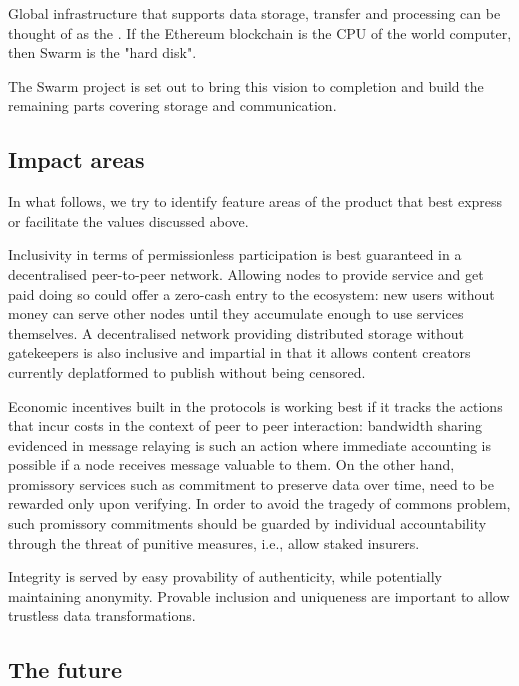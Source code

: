 Global infrastructure that supports data storage, transfer and processing 
can be thought of as the . If the Ethereum blockchain is the CPU of the world computer, then Swarm is the "hard disk".

The Swarm project is set out to bring this vision to completion and build the remaining parts covering storage and communication. 

\subsection{Impact areas \statusorange}

In what follows, we try to identify feature areas of the product that best express or facilitate the values discussed above. 

Inclusivity in terms of permissionless participation is best guaranteed in a decentralised peer-to-peer network.  
Allowing nodes to provide service and get paid doing so could offer a zero-cash entry to the ecosystem: new users without money can serve other nodes until they accumulate enough to use services themselves. A decentralised network providing distributed storage without gatekeepers is also inclusive and impartial in that it allows content creators currently deplatformed to publish without being censored. 

Economic incentives built in the protocols is working best if it tracks the actions that incur costs in the context of peer to peer interaction: bandwidth sharing evidenced in message relaying is such an action where immediate accounting is possible if a node receives message valuable to them. On the other hand, promissory services such as commitment to preserve data over time, need to be rewarded only upon verifying. In order to avoid the tragedy of commons problem, such promissory commitments should be guarded by individual accountability through the threat of punitive measures, i.e., allow staked insurers.

Integrity is served by easy provability of authenticity, while potentially maintaining anonymity.
Provable inclusion and uniqueness are important to allow trustless data transformations.


\subsection{The future} \label{sec:future}

